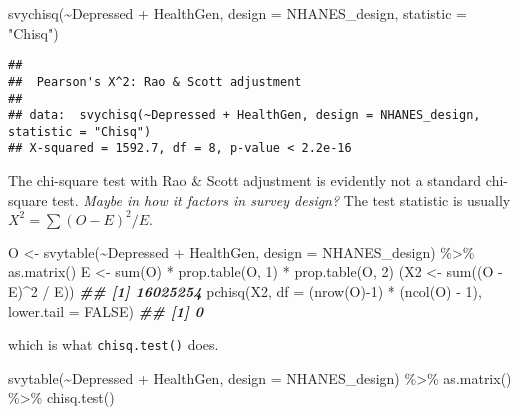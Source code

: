\documentclass[
]{book}
\newenvironment{Shaded}{\begin{snugshade}}{\end{snugshade}}
\newcommand{\AttributeTok}[1]{\textcolor[rgb]{0.77,0.63,0.00}{#1}}
\newcommand{\ConstantTok}[1]{\textcolor[rgb]{0.00,0.00,0.00}{#1}}
\newcommand{\DecValTok}[1]{\textcolor[rgb]{0.00,0.00,0.81}{#1}}
\newcommand{\DocumentationTok}[1]{\textcolor[rgb]{0.56,0.35,0.01}{\textbf{\textit{#1}}}}
\newcommand{\FunctionTok}[1]{\textcolor[rgb]{0.00,0.00,0.00}{#1}}
\newcommand{\NormalTok}[1]{#1}
\newcommand{\OtherTok}[1]{\textcolor[rgb]{0.56,0.35,0.01}{#1}}
\newcommand{\SpecialCharTok}[1]{\textcolor[rgb]{0.00,0.00,0.00}{#1}}
\newcommand{\StringTok}[1]{\textcolor[rgb]{0.31,0.60,0.02}{#1}}
\theoremstyle{definition}
\theoremstyle{definition}
\theoremstyle{definition}
\theoremstyle{definition}
\theoremstyle{remark}
\begin{document}
\begin{Shaded}
\begin{Highlighting}[]
\FunctionTok{svychisq}\NormalTok{(}\SpecialCharTok{\textasciitilde{}}\NormalTok{Depressed }\SpecialCharTok{+}\NormalTok{ HealthGen, }\AttributeTok{design =}\NormalTok{ NHANES\_design, }\AttributeTok{statistic =} \StringTok{"Chisq"}\NormalTok{)}
\end{Highlighting}
\end{Shaded}

\begin{verbatim}
## 
##  Pearson's X^2: Rao & Scott adjustment
## 
## data:  svychisq(~Depressed + HealthGen, design = NHANES_design, statistic = "Chisq")
## X-squared = 1592.7, df = 8, p-value < 2.2e-16
\end{verbatim}

The chi-square test with Rao \& Scott adjustment is evidently not a standard chi-square test. \emph{Maybe in how it factors in survey design?} The test statistic is usually \(X^2 = \sum (O - E)^2 / E.\)

\begin{Shaded}
\begin{Highlighting}[]
\NormalTok{O }\OtherTok{\textless{}{-}} \FunctionTok{svytable}\NormalTok{(}\SpecialCharTok{\textasciitilde{}}\NormalTok{Depressed }\SpecialCharTok{+}\NormalTok{ HealthGen, }\AttributeTok{design =}\NormalTok{ NHANES\_design) }\SpecialCharTok{\%\textgreater{}\%} \FunctionTok{as.matrix}\NormalTok{()}
\NormalTok{E }\OtherTok{\textless{}{-}} \FunctionTok{sum}\NormalTok{(O) }\SpecialCharTok{*} \FunctionTok{prop.table}\NormalTok{(O, }\DecValTok{1}\NormalTok{) }\SpecialCharTok{*} \FunctionTok{prop.table}\NormalTok{(O, }\DecValTok{2}\NormalTok{)}
\NormalTok{(X2 }\OtherTok{\textless{}{-}} \FunctionTok{sum}\NormalTok{((O }\SpecialCharTok{{-}}\NormalTok{ E)}\SpecialCharTok{\^{}}\DecValTok{2} \SpecialCharTok{/}\NormalTok{ E))}
\DocumentationTok{\#\# [1] 16025254}
\FunctionTok{pchisq}\NormalTok{(X2, }\AttributeTok{df =}\NormalTok{ (}\FunctionTok{nrow}\NormalTok{(O)}\SpecialCharTok{{-}}\DecValTok{1}\NormalTok{) }\SpecialCharTok{*}\NormalTok{ (}\FunctionTok{ncol}\NormalTok{(O) }\SpecialCharTok{{-}} \DecValTok{1}\NormalTok{), }\AttributeTok{lower.tail =} \ConstantTok{FALSE}\NormalTok{)}
\DocumentationTok{\#\# [1] 0}
\end{Highlighting}
\end{Shaded}

which is what \texttt{chisq.test()} does.

\begin{Shaded}
\begin{Highlighting}[]
\FunctionTok{svytable}\NormalTok{(}\SpecialCharTok{\textasciitilde{}}\NormalTok{Depressed }\SpecialCharTok{+}\NormalTok{ HealthGen, }\AttributeTok{design =}\NormalTok{ NHANES\_design) }\SpecialCharTok{\%\textgreater{}\%} 
  \FunctionTok{as.matrix}\NormalTok{() }\SpecialCharTok{\%\textgreater{}\%} 
  \FunctionTok{chisq.test}\NormalTok{()}
\end{Highlighting}
\end{Shaded}
\end{document}
